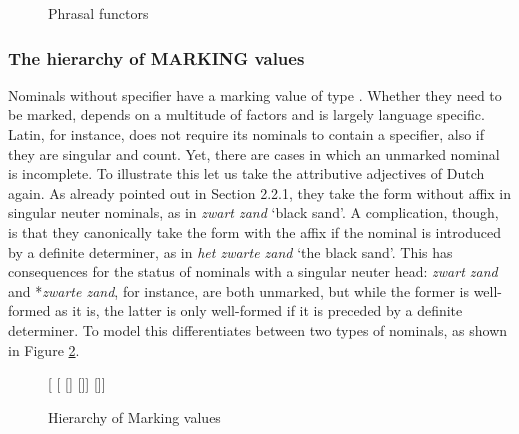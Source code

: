 \documentclass[output=paper]{langsci/langscibook}
\begin{document}
\begin{figure}
	\centering
{}
	\caption{\label{glorie} Phrasal functors }
\end{figure}


\subsubsection{The hierarchy of MARKING values} 
\label{sec-without-spec}

Nominals without specifier have a {\sc marking} value of type . 
Whether they need to be marked, depends on a multitude of factors and is 
largely language specific. 
Latin, for instance, does not require its nominals to contain a specifier, also 
if they are singular and count. Yet, there are cases in which an unmarked nominal 
is incomplete.    
To illustrate this let us take the attributive adjectives of Dutch again. 
As already pointed out in Section 2.2.1, they take the form without affix in  
singular neuter nominals, as in \emph{zwart zand} `black sand'. A complication, 
though, is that they canonically take the form with the affix if the nominal is  
introduced by a definite determiner, as in \emph{het zwarte zand} `the black sand'. 
This has consequences for the status of nominals with a singular neuter head: 
\emph{zwart zand} and *\emph{zwarte zand}, for instance, are both unmarked, 
but while the former is well-formed as it is, the latter is only 
well-formed if it is preceded by a definite determiner. 
To model this \citet{VanEynde06} differentiates between two types 
of  nominals, as shown in Figure \ref{bare}. 

\begin{figure}
	\centering
	\begin{forest}
[
	[
		[]
		[]]
	[]]		
	\end{forest}
	\caption{\label{bare} Hierarchy of Marking values} 
\end{figure}
\end{document}
